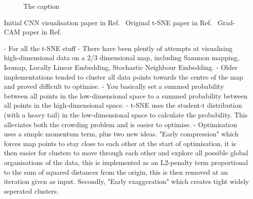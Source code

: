 \begin{figure}
{    }
    \quad
    \caption[The caption]
    {The caption}
\end{figure}

Initial CNN visualisation paper in Ref.~\cite{zeiler2013}
Original t-SNE paper in Ref.~\cite{maaten2008}
Grad-CAM paper in Ref.~\cite{selvaraju2017}

- For all the t-SNE stuff
- There have been plently of attempts at visualising high-dimensional data on a 2/3 dimensional
map, including Sammon mapping, Isomap, Locally Linear Embedding, Stochastic Neighbour Embedding.
- Older implementations tended to cluster all data points towards the centre of the map and proved
difficult to optimise.
- You basically set a summed probability between all points in the low-dimensional space to a
summed probability between all points in the high-dimensional space.
- t-SNE uses the student-t distribution (with a heavy tail) in the low-dimensional space to
calculate the probability. This alleviates both the crowding problem and is easier to optimise.
- Optimisation uses a simple momentum term, plus two new ideas. "Early compression" which forces
map points to stay close to each other at the start of optimisation, it is then easier for
clusters to move through each other and explore all possible global organisations of the data,
this is implemented as an L2-penalty term proportional to the sum of squared distances from the
origin, this is then removed at an iteration given as input. Secondly, "Early exaggeration" which
creates tight widely seperated clusters.

